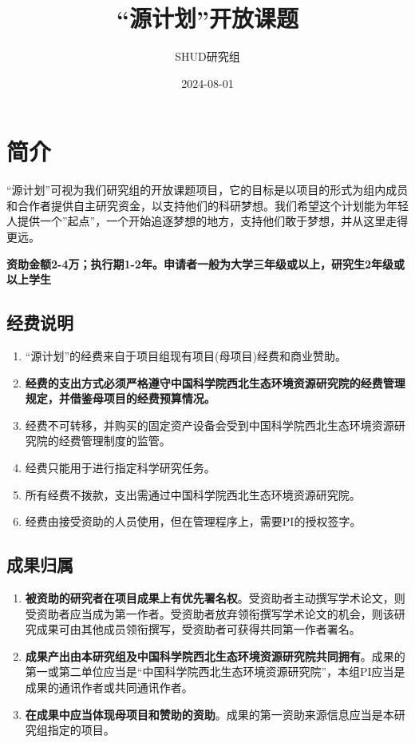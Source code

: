 \documentclass[
]{book}
\title{``源计划''开放课题}
\author{SHUD研究组}
\date{2024-08-01}
\providecommand{\tightlist}{%
  \setlength{\itemsep}{0pt}\setlength{\parskip}{0pt}}
\begin{document}
\maketitle

{
\setcounter{tocdepth}{1}
\tableofcontents
}
\hypertarget{ux7b80ux4ecb}{%
\chapter{简介}\label{ux7b80ux4ecb}}

``源计划''可视为我们研究组的开放课题项目，它的目标是以项目的形式为组内成员和合作者提供自主研究资金，以支持他们的科研梦想。我们希望这个计划能为年轻人提供一个''起点''，一个开始追逐梦想的地方，支持他们敢于梦想，并从这里走得更远。

\textbf{资助金额2-4万；执行期1-2年。申请者一般为大学三年级或以上，研究生2年级或以上学生}

\hypertarget{ux7ecfux8d39ux8bf4ux660e}{%
\section{经费说明}\label{ux7ecfux8d39ux8bf4ux660e}}

\begin{enumerate}
\def\labelenumi{\arabic{enumi}.}
\item
  ``源计划''的经费来自于项目组现有项目(母项目)经费和商业赞助。
\item
  \textbf{经费的支出方式必须严格遵守中国科学院西北生态环境资源研究院的经费管理规定，并借鉴母项目的经费预算情况。}
\item
  经费不可转移，并购买的固定资产设备会受到中国科学院西北生态环境资源研究院的经费管理制度的监管。
\item
  经费只能用于进行指定科学研究任务。
\item
  所有经费不拨款，支出需通过中国科学院西北生态环境资源研究院。
\item
  经费由接受资助的人员使用，但在管理程序上，需要PI的授权签字。
\end{enumerate}

\hypertarget{ux6210ux679cux5f52ux5c5e}{%
\section{成果归属}\label{ux6210ux679cux5f52ux5c5e}}

\begin{enumerate}
\def\labelenumi{\arabic{enumi}.}
\tightlist
\item
  \textbf{被资助的研究者在项目成果上有优先署名权}。受资助者主动撰写学术论文，则受资助者应当成为第一作者。受资助者放弃领衔撰写学术论文的机会，则该研究成果可由其他成员领衔撰写，受资助者可获得共同第一作者署名。
\item
  \textbf{成果产出由本研究组及中国科学院西北生态环境资源研究院共同拥有}。成果的第一或第二单位应当是``中国科学院西北生态环境资源研究院''，本组PI应当是成果的通讯作者或共同通讯作者。
\item
  \textbf{在成果中应当体现母项目和赞助的资助}。成果的第一资助来源信息应当是本研究组指定的项目。
\end{enumerate}
\end{document}

